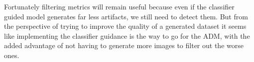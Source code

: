 Fortunately filtering metrics will remain useful because even if the classifier guided model generates far less artifacts, we still need to detect them. But from the perspective of trying to improve the quality of a generated dataset it seems like implementing the classifier guidance is the way to go for the \acs{ADM}, with the added advantage of not having to generate more images to filter out the worse ones.





